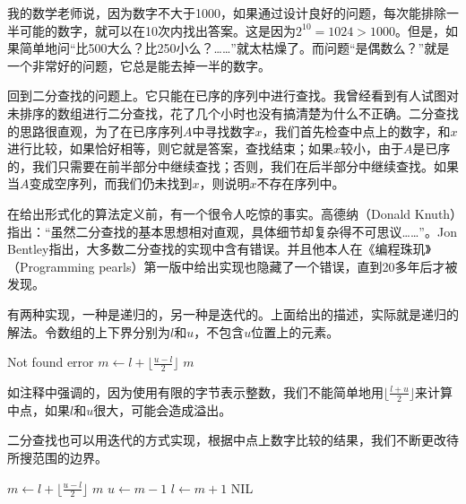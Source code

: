 \documentclass[UTF8]{article}
\begin{document}
我的数学老师说，因为数字不大于1000，如果通过设计良好的问题，每次能排除一半可能的数字，就可以在10次内找出答案。这是因为$2^{10} = 1024 > 1000$。但是，如果简单地问“比500大么？比250小么？……”就太枯燥了。而问题“是偶数么？”就是一个非常好的问题，它总是能去掉一半的数字。

回到二分查找的问题上。它只能在已序的序列中进行查找。我曾经看到有人试图对未排序的数组进行二分查找，花了几个小时也没有搞清楚为什么不正确。二分查找的思路很直观，为了在已序序列$A$中寻找数字$x$，我们首先检查中点上的数字，和$x$进行比较，如果恰好相等，则它就是答案，查找结束；如果$x$较小，由于$A$是已序的，我们只需要在前半部分中继续查找；否则，我们在后半部分中继续查找。如果当$A$变成空序列，而我们仍未找到$x$，则说明$x$不存在序列中。

在给出形式化的算法定义前，有一个很令人吃惊的事实。高德纳（Donald Knuth）指出：“虽然二分查找的基本思想相对直观，具体细节却复杂得不可思议……”。Jon Bentley指出，大多数二分查找的实现中含有错误。并且他本人在《编程珠玑》（Programming pearls）第一版中给出实现也隐藏了一个错误，直到20多年后才被发现\cite{programming-pearls}。

有两种实现，一种是递归的，另一种是迭代的。上面给出的描述，实际就是递归的解法。令数组的上下界分别为$l$和$u$，不包含$u$位置上的元素。

\begin{algorithmic}[1]
    \State Not found error
  \Else
     \State $m \gets l + \lfloor \frac{u - l}{2} \rfloor$ 
       \State \Return $m$
     \EndIf
       \State \Return {}
     \Else
       \State \Return {}
     \EndIf
  \EndIf
\EndFunction
\end{algorithmic}

如注释中强调的，因为使用有限的字节表示整数，我们不能简单地用$\lfloor \frac{l+u}{2} \rfloor$来计算中点，如果$l$和$u$很大，可能会造成溢出。

二分查找也可以用迭代的方式实现，根据中点上数字比较的结果，我们不断更改待所搜范围的边界。

\begin{algorithmic}[1]
    \State $m \gets l + \lfloor \frac{u - l}{2} \rfloor$
      \State \Return $m$
    \EndIf
      \State $u \gets m - 1$
    \Else
      \State $l \gets m + 1$
    \EndIf
  \EndWhile
  \Return NIL
\EndFunction
\end{algorithmic}
\end{document}

